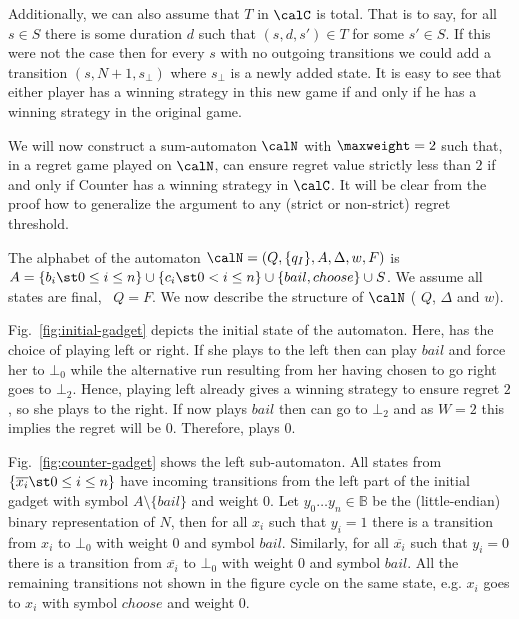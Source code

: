 \documentclass[a4paper]{article}
\begin{document}
Additionally, we can also assume that $T$ in $\calC$ is total. That is
to say, for all $s \in S$ there is some duration $d$ such that $(s,d,s')
\in T$ for some $s' \in S$. If this were not the case then for every $s$
with no outgoing transitions we could add a transition
$(s,N+1,s_\bot)$ where $s_\bot$ is a newly added state. It is easy
to see that either player has a winning strategy in this new game if and
only if he has a winning strategy in the original game.

We will now construct a sum-automaton $\calN$ with $\maxweight = 2$ such that,
in a regret game played on $\calN$, \eve
can ensure regret value strictly less than $2$ if and only if Counter
has a winning strategy in $\calC$. It will be clear from the proof how
to generalize the argument to any (strict or non-strict) regret
threshold.

The alphabet of the automaton $\calN =
(Q,\{q_I\},A,\Delta,w,F)$ is $A =
\{b_i \st 0 \le i \le n\} \cup \{c_i \st 0 < i \le n\} \cup
\{bail,choose\} \cup S$. We assume all states are final, \ie~$Q = F$.
We now describe the structure of $\calN$ (\ie
$Q$, $\Delta$ and $w$). 
	
 Fig.~\ref{fig:initial-gadget} depicts the
initial state of the automaton.  Here, \eve has the choice of playing left
or right. If she plays to the left then \adam can play $bail$ and force
her to $\bot_0$ while the alternative run resulting from her having
chosen to go right goes to $\bot_2$. Hence, playing left already gives
\adam a winning strategy to ensure regret $2$, so she plays to the
right. If \adam now plays $bail$ then \eve can go to $\bot_2$ and as $W
=2$ this implies the regret will be $0$. Therefore, \adam plays $0$.

 Fig.~\ref{fig:counter-gadget} shows the left
sub-automaton. All states from $\{\overline{x_i} \st 0 \le i \le n\}$ have
incoming transitions from the left part of the initial gadget with
symbol $A \setminus \{bail\}$ and weight $0$. Let $y_0 \dots y_n \in
\mathbb{B}$ be the (little-endian) binary representation of $N$, then
for all $x_i$ such that $y_i = 1$ there is a transition from $x_i$ to
$\bot_0$ with weight $0$ and symbol $bail$. Similarly, for all
$\overline{x_i}$ such that $y_i = 0$ there is a transition from
$\overline{x_i}$ to $\bot_0$ with weight $0$ and symbol $bail$. All the
remaining transitions not shown in the figure cycle on the same state,
e.g. $x_i$ goes to $x_i$ with symbol $choose$ and weight $0$. 
\end{document}
